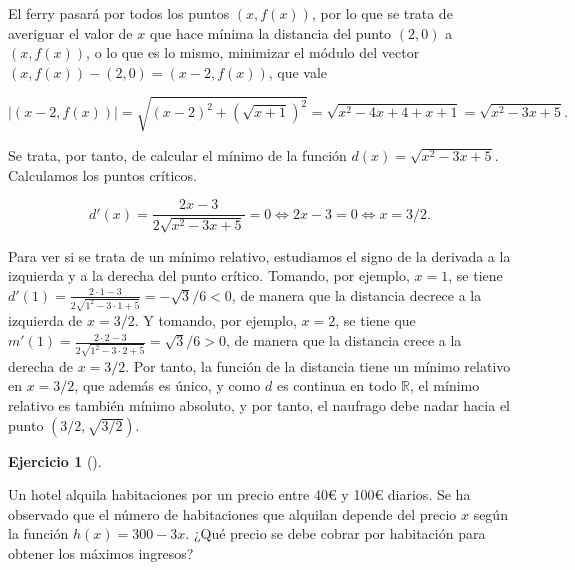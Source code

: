 \documentclass[
  spanish,
  a4paper,
]{scrreport}
\theoremstyle{definition}
\newtheorem{exercise}{Ejercicio}[chapter]
\theoremstyle{remark}
\begin{document}
\begin{tcolorbox}[enhanced jigsaw, arc=.35mm, bottomrule=.15mm, bottomtitle=1mm, breakable, colback=white, colbacktitle=quarto-callout-tip-color!10!white, colframe=quarto-callout-tip-color-frame, coltitle=black, left=2mm, leftrule=.75mm, opacityback=0, opacitybacktitle=0.6, rightrule=.15mm, title=\textcolor{quarto-callout-tip-color}{\faLightbulb}\hspace{0.5em}{Solución}, titlerule=0mm, toprule=.15mm, toptitle=1mm]

El ferry pasará por todos los puntos \((x,f(x))\), por lo que se trata
de averiguar el valor de \(x\) que hace mínima la distancia del punto
\((2,0)\) a \((x,f(x))\), o lo que es lo mismo, minimizar el módulo del
vector \((x,f(x))-(2,0) = (x-2, f(x))\), que vale

\[
|(x-2,f(x))|=\sqrt{(x-2)^2+(\sqrt{x+1})^2} = \sqrt{x^2-4x+4+x+1} = \sqrt{x^2-3x+5}.
\]

Se trata, por tanto, de calcular el mínimo de la función
\(d(x)=\sqrt{x^2-3x+5}\). Calculamos los puntos críticos.

\[
d'(x) = \frac{2x-3}{2\sqrt{x^2-3x+5}} = 0 \Leftrightarrow 2x-3 = 0 \Leftrightarrow x=3/2.
\]

Para ver si se trata de un mínimo relativo, estudiamos el signo de la
derivada a la izquierda y a la derecha del punto crítico. Tomando, por
ejemplo, \(x=1\), se tiene
\(d'(1) = \frac{2\cdot 1-3}{2\sqrt{1^2-3\cdot 1+5}} = -\sqrt{3}/6<0\),
de manera que la distancia decrece a la izquierda de \(x=3/2\). Y
tomando, por ejemplo, \(x=2\), se tiene que
\(m'(1)=\frac{2\cdot 2-3}{2\sqrt{1^2-3\cdot 2+5}}=\sqrt{3}/6>0\), de
manera que la distancia crece a la derecha de \(x=3/2\). Por tanto, la
función de la distancia tiene un mínimo relativo en \(x=3/2\), que
además es único, y como \(d\) es continua en todo \(\mathbb{R}\), el
mínimo relativo es también mínimo absoluto, y por tanto, el naufrago
debe nadar hacia el punto \((3/2, \sqrt{3/2})\).

\end{tcolorbox}

\begin{exercise}[]\protect\hypertarget{exr-extremos-6}{}\label{exr-extremos-6}

Un hotel alquila habitaciones por un precio entre 40€ y 100€ diarios. Se
ha observado que el número de habitaciones que alquilan depende del
precio \(x\) según la función \(h(x)=300-3x\). ¿Qué precio se debe
cobrar por habitación para obtener los máximos ingresos?

\end{exercise}
\end{document}
